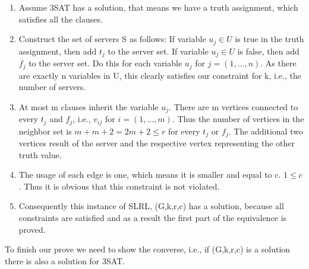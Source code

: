 \documentclass [12pt]{article}
\begin{document}
\begin{enumerate}
  \item{Assume 3SAT has a solution, that means we have a truth assignment, 
    which satisfies all the clauses.}
  \item{Construct the set of servers S as follows: If variable $u_j \in U$ is true
      in the truth assignment, then add $t_j$ to the server set. If variable $u_j \in U$
      is false, then add $f_j$ to the server set. Do this for each variable $u_j$ for $j = (1,\dots,n)$.
      As there are exactly n variables in U, this clearly satisfies our constraint 
    for k, i.e., the number of servers.}
  \item{At most m clauses inherit the variable $u_j$. There are m vertices connected to every
      $t_j$ and $f_j$, i.e., $v_{ij}$ for $i=(1,\dots,m)$.
      Thus the number of vertices in the neighbor set is $m+m+2 = 2m+2 \leq r $ for every 
      $t_j$ or $f_j$. The additional two vertices result of the server and the respective 
    vertex representing the other truth value.}
  \item{The usage of each edge is one, which means it is smaller and equal to c. $1\leq c$.
    Thus it is obvious that this constraint is not violated.}

  \item{Consequently this instance of SLRL, (G,k,r,c) has a solution, because all constraints are satisfied 
    and as a result the first part of the equivalence is proved.}
\end{enumerate}
To finish our prove we need to show the converse, i.e., 
if (G,k,r,c) is a solution there is also a solution for 3SAT. 
\end{document}
